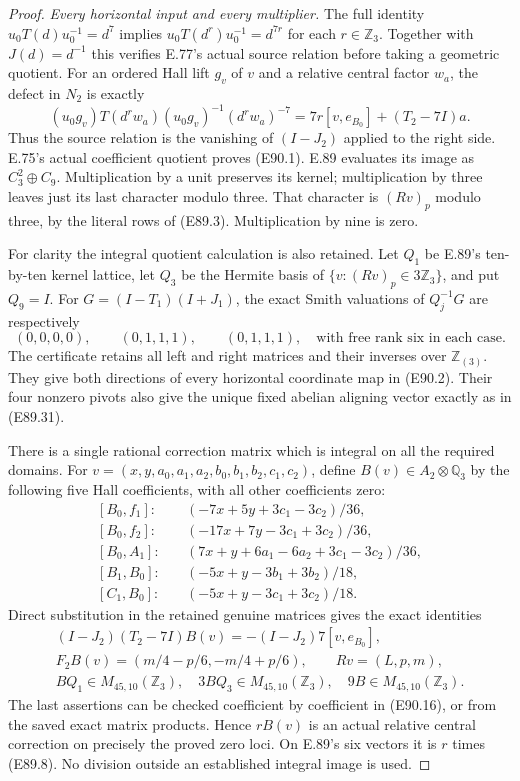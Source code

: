 \begin{proof}
\emph{Every horizontal input and every multiplier.}
The full identity $u_0T(d)u_0^{-1}=d^7$ implies
$u_0T(d^r)u_0^{-1}=d^{7r}$ for each $r\in\mathbb Z_3$.
Together with $J(d)=d^{-1}$ this verifies E.77's
actual source relation before taking a geometric
quotient. For an ordered Hall lift $g_v$ of $v$
and a relative central factor $w_a$, the defect
in $N_2$ is exactly
\[
 (u_0g_v)T(d^r w_a)(u_0g_v)^{-1}(d^r w_a)^{-7}
       =7r[v,e_{B_0}]+(T_2-7I)a.
 \tag{E90.14}
\]
Thus the source relation is the vanishing of
$(I-J_2)$ applied to the right side. E.75's
actual coefficient quotient proves (E90.1).
E.89 evaluates its image as $C_3^2\oplus C_9$.
Multiplication by a unit preserves its kernel;
multiplication by three leaves just its last
character modulo three. That character is
$(Rv)_p$ modulo three, by the literal rows of
(E89.3). Multiplication by nine is zero.

For clarity the integral quotient calculation
is also retained. Let $Q_1$ be E.89's ten-by-ten
kernel lattice, let $Q_3$ be the Hermite basis
of $\{v:(Rv)_p\in3\mathbb Z_3\}$, and put
$Q_9=I$. For $G=(I-T_1)(I+J_1)$, the exact
Smith valuations of $Q_j^{-1}G$ are respectively
\[
       (0,0,0,0),\qquad(0,1,1,1),\qquad(0,1,1,1),
       \quad\text{with free rank six in each case}.
 \tag{E90.15}
\]
The certificate retains all left and right
matrices and their inverses over $\mathbb Z_{(3)}$.
They give both directions of every horizontal
coordinate map in (E90.2). Their four nonzero
pivots also give the unique fixed abelian
aligning vector exactly as in (E89.31).

There is a single rational correction matrix
which is integral on all the required domains.
For $v=(x,y,a_0,a_1,a_2,b_0,b_1,b_2,c_1,c_2)$,
define $B(v)\in A_2\otimes\mathbb Q_3$ by the
following five Hall coefficients, with all
other coefficients zero:
\[
\begin{aligned}
 [B_0,f_1]:&\quad(-7x+5y+3c_1-3c_2)/36,\\
 [B_0,f_2]:&\quad(-17x+7y-3c_1+3c_2)/36,\\
 [B_0,A_1]:&\quad(7x+y+6a_1-6a_2+3c_1-3c_2)/36,\\
 [B_1,B_0]:&\quad(-5x+y-3b_1+3b_2)/18,\\
 [C_1,B_0]:&\quad(-5x+y-3c_1+3c_2)/18.
\end{aligned}
 \tag{E90.16}
\]
Direct substitution in the retained genuine
matrices gives the exact identities
\[
\begin{gathered}
 (I-J_2)(T_2-7I)B(v)=-(I-J_2)7[v,e_{B_0}],\\
 F_2B(v)=(m/4-p/6,-m/4+p/6),\qquad Rv=(L,p,m),\\
 BQ_1\in M_{45,10}(\mathbb Z_3),\quad
 3BQ_3\in M_{45,10}(\mathbb Z_3),\quad
 9B\in M_{45,10}(\mathbb Z_3).
\end{gathered}
 \tag{E90.17}
\]
The last assertions can be checked coefficient
by coefficient in (E90.16), or from the saved
exact matrix products. Hence $rB(v)$ is an
actual relative central correction on precisely
the proved zero loci. On E.89's six vectors it
is $r$ times (E89.8). No division outside an
established integral image is used.


\end{proof}
